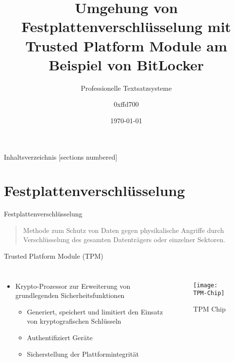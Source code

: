 \documentclass[10pt]{beamer}
\title{Umgehung von Festplattenverschlüsselung mit Trusted Platform Module am Beispiel von BitLocker}
\subtitle{Professionelle Textsatzsysteme}
\date{\today}
\author{0xffd700}
\begin{document}
	
	\maketitle
	
	\begin{frame}{Inhaltsverzeichnis}
		[sections numbered]
		\tableofcontents[hideallsubsections]
	\end{frame}

	
	\section{Festplattenverschlüsselung}
	
	\begin{frame}[fragile]{Festplattenverschlüsselung}
		
		\begin{quote}
			\centering
			Methode zum Schutz von Daten gegen physikalische Angriffe durch Verschlüsselung des gesamten Datenträgers oder einzelner Sektoren.
		\end{quote}
	\cite{SibingerChristophANDMullerTilo.2014}
		
	\end{frame}

	\begin{frame}[fragile]{Trusted Platform Module (TPM)}
		
		\begin{columns}[T,onlytextwidth]
			\begin{itemize}[<+- | alert@+>]
				\item Krypto-Prozessor zur Erweiterung von grundlegenden Sicherheitsfunktionen 
				\begin{itemize}
					\item Generiert, speichert und limitiert den Einsatz von kryptografischen Schlüsseln
					\item Authentifiziert Geräte
					\item Sicherstellung der Plattformintegrität
				\end{itemize}
			\end{itemize}
			
			\begin{figure}[h!]
				\centering
				\texttt{[image: TPM-Chip]}
				\caption{TPM Chip \cite{.04102021}}
			\end{figure}
		\end{columns}
	\cite{TrustedComputingGroup.30072020}
	\end{frame}
	
\end{document}
